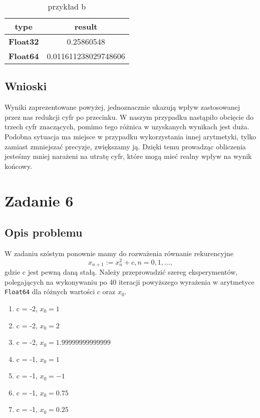 \documentclass{article}
\begin{document}
\begin{center}
    \begin{table}[h!]
    \centering
    \begin{tabular}{||c c||} 
    \hline
    \textbf{type} & \textbf{result} \\ [0.5ex]
    \hline\hline
    \textbf{Float32} & 0.25860548  \\ 
    \textbf{Float64} & 0.011611238029748606 \\
    \hline
    \end{tabular}
    \caption{przykład b}
    \label{table:8}
    \end{table}

    \subsection{Wnioski}
    \large Wyniki zaprezentowane powyżej, jednoznacznie ukazują wpływ zastosowanej przez nas redukcji cyfr po przecinku.
     W naszym przypadku nastąpiło obcięcie do trzech cyfr znaczących, pomimo tego różnica w uzyskanych wynikach jest duża.
     Podobna sytuacja ma miejsce w przypadku wykorzystania innej arytmetyki, tylko zamiast zmniejszać precyzje, zwiększamy ją.
     Dzięki temu prowadząc obliczenia jesteśmy mniej narażeni na utratę cyfr, które mogą mieć realny wpływ na wynik końcowy.

    \section{Zadanie 6}
    \subsection{Opis problemu}
    \large W zadaniu szóstym ponownie mamy do rozważenia równanie rekurencyjne
    \[x_{n+1} := x^{2}_{n} + c, n = 0,1,\ldots,\]
    gdzie c jest pewną daną stałą. Należy przeprowadzić szereg eksperymentów, polegających 
    na wykonywaniu po 40 iteracji powyższego wyrażenia w arytmetyce \texttt{Float64} dla różnych wartości \(c\) oraz \(x_{0}\).
    \begin{enumerate}
        \item c = -2, \(x_0 = 1\)
        \item c = -2, \(x_0 = 2\)
        \item c = -2, \(x_0 = 1.99999999999999\)
        \item c = -1, \(x_0 = 1\)
        \item c = -1, \(x_0 = -1\)
        \item c = -1, \(x_0 = 0.75\)
        \item c = -1, \(x_0 = 0.25\)
    \end{enumerate}
    \newpage

\end{center}
\end{document}
